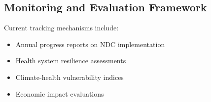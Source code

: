 \subsection{Monitoring and Evaluation Framework}
Current tracking mechanisms include:

\begin{itemize}
    \item Annual progress reports on NDC implementation
    \item Health system resilience assessments
    \item Climate-health vulnerability indices
    \item Economic impact evaluations
\end{itemize}
